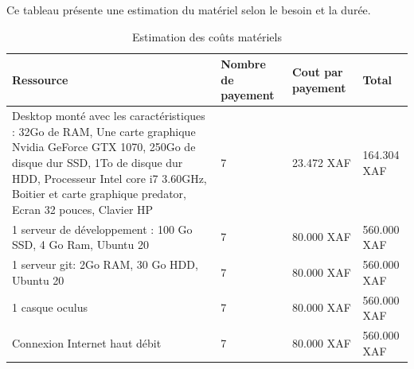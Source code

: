 Ce tableau présente une estimation du matériel selon le besoin et la durée.

\begin{table}[H]
	\caption{Estimation des coûts matériels}

	\begin{tabular}{ |p{7cm}|p{2cm}|p{3cm}|p{3cm}| }
		\hline
		\textbf{Ressource}                                                                                                                                                                                                                                     & \textbf{Nombre de payement} & \textbf{Cout par payement} & \textbf{Total} \\
		\hline
		Desktop monté avec les caractéristiques : 32Go de RAM, Une carte graphique Nvidia GeForce GTX 1070, 250Go de disque dur SSD, 1To de disque dur HDD, Processeur Intel core i7 3.60GHz, Boitier et carte graphique predator, Ecran 32 pouces, Clavier HP & 7                           & 23.472 XAF                 & 164.304 XAF    \\
		\hline
		1 serveur de développement : 100 Go SSD, 4 Go Ram, Ubuntu 20                                                                                                                                                                                           & 7                           & 80.000 XAF                 & 560.000 XAF    \\
		\hline
		1 serveur git: 2Go RAM, 30 Go HDD, Ubuntu 20                                                                                                                                                                                                           & 7                           & 80.000 XAF                 & 560.000 XAF    \\
		\hline
		1 casque oculus                                                                                                                                                                                                                                        & 7                           & 80.000 XAF                 & 560.000 XAF    \\
		\hline
		Connexion Internet haut débit                                                                                                                                                                                                                          & 7                           & 80.000 XAF                 & 560.000 XAF    \\

\end{tabular}
\end{table}
